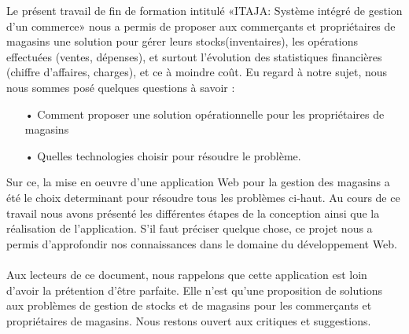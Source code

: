 \conclusion
Le présent travail de fin de formation intitulé «ITAJA: Système intégré de gestion d’un commerce» nous a permis de proposer aux commerçants et propriétaires de magasins une solution pour gérer leurs stocks(inventaires), les opérations effectuées (ventes, dépenses), et surtout l'évolution des statistiques financières (chiffre d'affaires, charges), et ce à moindre coût. Eu regard à notre sujet, nous nous sommes posé quelques questions à savoir :

\begin{enumerate}
  \item[•] Comment proposer une solution opérationnelle pour les propriétaires de magasins
  \item[•] Quelles technologies choisir pour résoudre le problème.
\end{enumerate}

Sur ce, la mise en oeuvre d’une application Web pour la gestion des magasins a été le choix determinant pour résoudre tous les problèmes ci-haut. Au cours de ce travail nous avons présenté les différentes étapes de la conception ainsi que la réalisation de l’application. S’il faut préciser quelque chose, ce projet nous a permis d’approfondir nos connaissances dans le domaine du développement Web.

\paragraph{}
  Aux lecteurs de ce document, nous rappelons que cette application est loin d’avoir la prétention d’être parfaite. Elle n’est qu’une proposition de solutions aux problèmes de gestion de stocks et de magasins pour les commerçants et propriétaires de magasins. Nous restons ouvert aux critiques et suggestions.